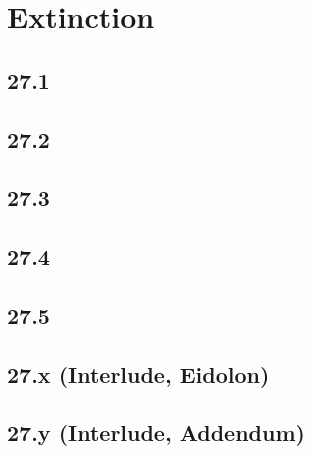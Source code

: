 \part{Extinction}
 \chapter{27.1}
 \chapter{27.2}
 \chapter{27.3}
 \chapter{27.4}
 \chapter{27.5}
 \chapter{27.x (Interlude, Eidolon)}
 \chapter{27.y (Interlude, Addendum)}








